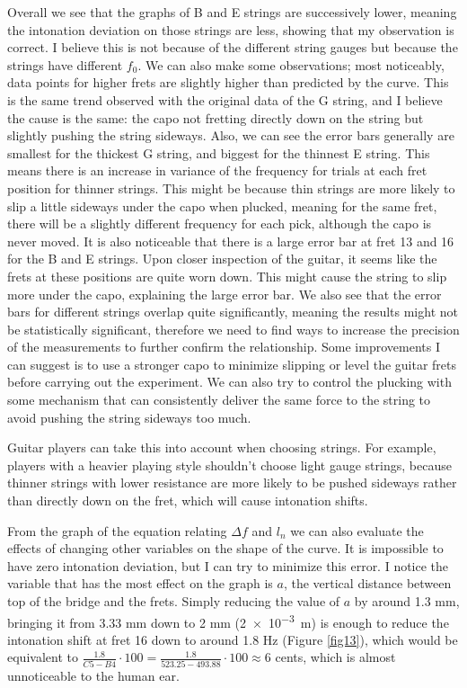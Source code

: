 Overall we see that the graphs of B and E strings are successively lower, meaning the intonation deviation on those strings are less, showing that my observation is correct. I believe this is not because of the different string gauges but because the strings have different $f_0$. We can also make some observations; most noticeably, data points for higher frets are slightly higher than predicted by the curve. This is the same trend observed with the original data of the G string, and I believe the cause is the same: the capo not fretting directly down on the string but slightly pushing the string sideways. Also, we can see the error bars generally are smallest for the thickest G string, and biggest for the thinnest E string. This means there is an increase in variance of the frequency for trials at each fret position for thinner strings. This might be because thin strings are more likely to slip a little sideways under the capo when plucked, meaning for the same fret, there will be a slightly different frequency for each pick, although the capo is never moved. It is also noticeable that there is a large error bar at fret 13 and 16 for the B and E strings. Upon closer inspection of the guitar, it seems like the frets at these positions are quite worn down. This might cause the string to slip more under the capo, explaining the large error bar. We also see that the error bars for different strings overlap quite significantly, meaning the results might not be statistically significant, therefore we need to find ways to increase the precision of the measurements to further confirm the relationship. Some improvements I can suggest is to use a stronger capo to minimize slipping or level the guitar frets before carrying out the experiment. We can also try to control the plucking with some mechanism that can consistently deliver the same force to the string to avoid pushing the string sideways too much. 

Guitar players can take this into account when choosing strings. For example, players with a heavier playing style shouldn't choose light gauge strings, because thinner strings with lower resistance are more likely to be pushed sideways rather than directly down on the fret, which will cause intonation shifts.

From the graph of the equation relating $\Delta f$ and $l_n$ we can also evaluate the effects of changing other variables on the shape of the curve. It is impossible to have zero intonation deviation, but I can try to minimize this error. I notice the variable that has the most effect on the graph is $a$, the vertical distance between top of the bridge and the frets. Simply reducing the value of $a$ by around 1.3 mm, bringing it from 3.33 mm down to 2 mm (\SI{2e-3}{m}) is enough to reduce the intonation shift at fret 16 down to around 1.8 Hz (Figure \ref{fig13}), which would be equivalent to $\frac{1.8}{C5-B4}\cdot 100 = \frac{1.8}{523.25-493.88} \cdot 100 \approx 6$ cents, which is almost unnoticeable to the human ear. \cite{loeffler}

